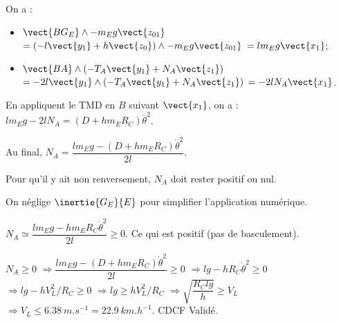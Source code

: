 \begin{multicols}{2}
\begin{corrige}
\end{corrige}
\else
\fi


\ifnormal
{}
\else
\fi
\ifprof
\begin{corrige}
On a : 
\begin{itemize}
\item $\vect{BG_E}\wedge - m_E g \vect{z_{01}}$ 
$=\left(-l\vect{y_1}+h\vect{z_0} \right) \wedge - m_E g \vect{z_{01}}$
$=l  m_E g \vect{x_{1}}$;
\item $\vect{BA}\wedge \left(-T_A\vect{y_1}+N_A\vect{z_1} \right)$ 
$=-2l\vect{y_1}\wedge \left(-T_A\vect{y_1}+N_A\vect{z_1} \right)$
$=-2l N_A\vect{x_1} $.
\end{itemize}
En appliquent le TMD en $B$ suivant $\vect{x_1}$, on a : $l  m_E g -2l N_A=\left(D+ h m_E R_C\right)\dot{\theta}^2$. 

Au final,  $ N_A=\dfrac{ l  m_E g-\left(D+ h m_E R_C\right)\dot{\theta}^2}{2l}$. 
\end{corrige}
\else
\fi

\ifnormal
{}
\else
\fi

\ifprof
\begin{corrige}
Pour qu'il y ait non renversement, $N_A$ doit rester positif ou nul. 
\end{corrige}
\else
\fi

\iftdifficile
{}

\else
\fi


On néglige $\inertie{G_E}{E}$ pour simplifier l’application numérique.

\ifprof
\begin{corrige}
$ N_A\simeq\dfrac{l  m_E g-h m_E R_C\dot{\theta}^2 }{2l} \geq 0$.%
Ce qui est positif (pas de basculement). 

$N_A\geq0$ $\Rightarrow  \dfrac{ l  m_E g-\left(D+ h m_E R_C\right)\dot{\theta}^2}{2l}\geq0$
$\Rightarrow  l  g- h  R_C\dot{\theta}^2\geq0$
$\Rightarrow  l  g- h  V_L^2/R_C\geq0$
$\Rightarrow  l  g \geq h  V_L^2/R_C$
$\Rightarrow   \sqrt{\dfrac{R_C l  g}{h}} \geq   V_L$
$\Rightarrow     V_L  \leq \SI{6,38}{m.s^{-1}}=\SI{22,9}{km.h^{-1}}$. 
CDCF Validé.
\end{corrige}
\else
\fi


\end{multicols}
